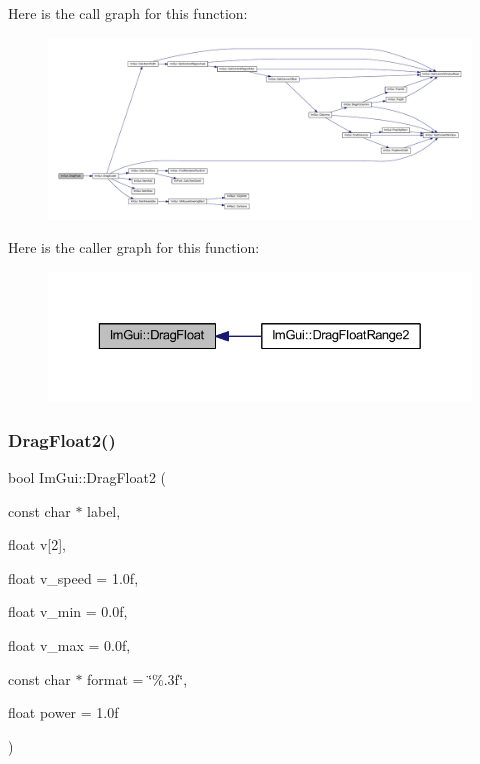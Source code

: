 Here is the call graph for this function\+:
\nopagebreak
\begin{figure}[H]
\begin{center}
\leavevmode
\includegraphics[width=350pt]{namespace_im_gui_aa797a92d52ffa907cb5186a8476f1c20_cgraph}
\end{center}
\end{figure}
Here is the caller graph for this function\+:
\nopagebreak
\begin{figure}[H]
\begin{center}
\leavevmode
\includegraphics[width=329pt]{namespace_im_gui_aa797a92d52ffa907cb5186a8476f1c20_icgraph}
\end{center}
\end{figure}
\mbox{\label{namespace_im_gui_acabf4e1f3f5d878e88591424623526e9}} 
\subsubsection{\texorpdfstring{Drag\+Float2()}{DragFloat2()}}
{\footnotesize\ttfamily bool Im\+Gui\+::\+Drag\+Float2 (\begin{DoxyParamCaption}\item[{const char $\ast$}]{label,  }\item[{float}]{v\mbox{[}2\mbox{]},  }\item[{float}]{v\+\_\+speed = {\ttfamily 1.0f},  }\item[{float}]{v\+\_\+min = {\ttfamily 0.0f},  }\item[{float}]{v\+\_\+max = {\ttfamily 0.0f},  }\item[{const char $\ast$}]{format = {\ttfamily \char`\"{}\%.3f\char`\"{}},  }\item[{float}]{power = {\ttfamily 1.0f} }\end{DoxyParamCaption})}

